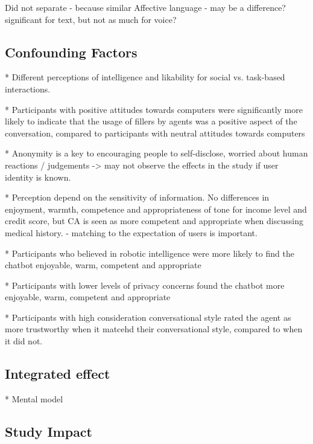 \documentclass[sigconf,screen,review, anonymous]{acmart}
\newcommand{\cmt}[1]{}%
\begin{document}
Did not separate - because similar 
Affective language - may be a difference? significant for text, but not as much for voice?

\subsection{Confounding Factors}

* Different perceptions of intelligence and likability for social vs. task-based interactions. \cite{jeong2019exploring}\cmt{[10]}

* Participants with positive attitudes towards computers were significantly more likely to indicate that the usage of fillers by agents was a positive aspect of the conversation, compared to participants with neutral attitudes towards computers \cite{pfeifer2009should}\cmt{[12]}

* Anonymity is a key to encouraging people to self-disclose, worried about human reactions / judgements -> may not observe the effects in the study if user identity is known. \cite{lee2020hear}\cmt{[23]}

* Perception depend on the sensitivity of information. No differences in enjoyment, warmth, competence and appropriateness of tone for income level and credit score, but CA is seen as more competent and appropriate when discussing medical history. \cite{cox2022does}\cmt{[27]} - matching to the expectation of users is important.

* Participants who believed in robotic intelligence were more likely to find the chatbot enjoyable, warm, competent and appropriate \cite{cox2022does}\cmt{[27]}

* Participants with lower levels of privacy concerns found the chatbot more enjoyable, warm, competent and appropriate \cite{cox2022does}\cmt{[27]}

* Participants with high consideration conversational style rated the agent as more trustworthy when it matcehd their conversational style, compared to when it did not. \cite{hoegen2019end}\cmt{[31]}

\subsection{Integrated effect}

* Mental model

\subsection{Study Impact}
\end{document}
